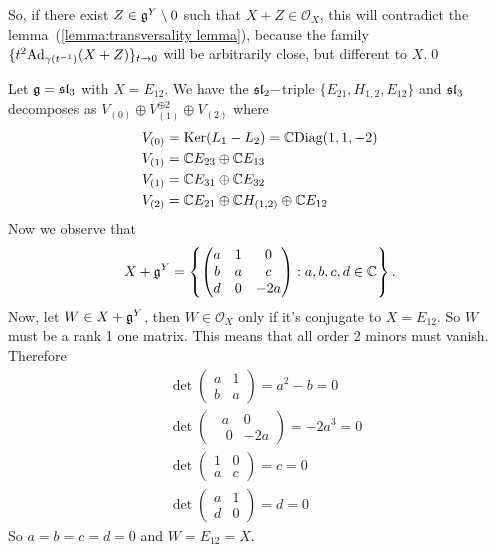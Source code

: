 So, if there exist $Z\in\mathfrak{g}^Y\setminus0$ such that $X+Z\in\mathcal{O}_X$, 
this will contradict the lemma~(\ref{lemma:transversality lemma}), because the family 
$\{t^2\text{Ad}_{\gamma(t^{-1})}(X+Z)\}_{t\to0}$ will be arbitrarily close, but different to $X$.\qed 
    \begin{example}
        Let $\mathfrak{g}=\mathfrak{sl}_3$ with $X=E_{12}$. We have the $\mathfrak{sl}_2-$triple $\{E_{21},H_{1,2},E_{12}\}$ and 
        $\mathfrak{sl}_3$ decomposes as $V_{(0)}\oplus V_{(1)}^{\oplus2}\oplus V_{(2)}$ where 
        \begin{equation}
            \begin{aligned}
                &V_{(0)}=\text{Ker}(L_1-L_2)=\mathbb{C}\text{Diag}(1,1,-2)\\
                &V_{(1)}=\mathbb{C} E_{23}\oplus\mathbb{C} E_{13}\\
                &V_{(1)}=\mathbb{C} E_{31}\oplus\mathbb{C} E_{32}\\
                &V_{(2)}=\mathbb{C} E_{21}\oplus \mathbb{C} H_{(1,2)}\oplus\mathbb{C} E_{12}
            \end{aligned}
        \end{equation}
Now we observe that 
\begin{equation}
    X+\mathfrak{g}^Y=\left\{
        \begin{pmatrix}
            a&1&0\\b&a&c\\d&0&-2a
        \end{pmatrix}:
        a,b,c,d\in\mathbb{C}
    \right\}.
\end{equation}
Now, let $W\in X+\mathfrak{g}^Y$, then $W\in\mathcal{O}_X$ only if it's conjugate to $X=E_{12}$. So $W$ must be a rank 1 one matrix. 
This means that all order 2 minors must vanish. Therefore
\begin{equation}
    \begin{aligned}
        &\det\begin{pmatrix}a&1\\b&a\end{pmatrix}=a^2-b=0\\
        &\det\begin{pmatrix}\;\;a&0\\\;\;\;0&-2a\end{pmatrix}=-2a^3=0\\
        &\det\begin{pmatrix}1&0\\a&c\end{pmatrix}=c=0\\
        &\det\begin{pmatrix}a&1\\d&0\end{pmatrix}=d=0
    \end{aligned}
\end{equation}
So $a=b=c=d=0$ and $W=E_{12}=X$.
\end{example}

